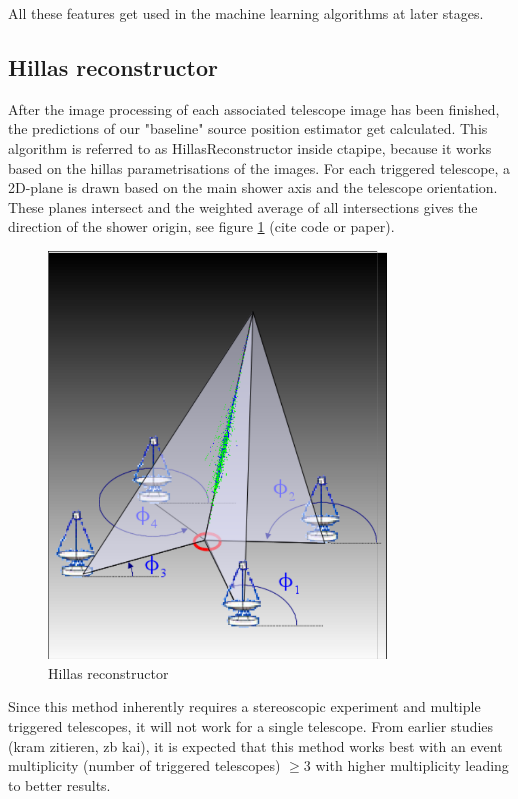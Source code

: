 All these features get used in the machine learning algorithms at later stages.

\subsection{Hillas reconstructor}  %
After the image processing of each associated telescope image has been finished,
the predictions of our "baseline" source position estimator get calculated.
This algorithm is referred to as HillasReconstructor inside ctapipe, because 
it works based on the hillas parametrisations of the images.
For each triggered telescope, a 2D-plane is drawn based on the main shower 
axis and the telescope orientation. These planes intersect and 
the weighted average of all intersections gives the 
direction of the shower origin,
see figure \ref{fig:hillas_reconstructor} (cite code or paper).

\begin{figure}
	\centering
	\includegraphics[width=0.8\textwidth]{images/hillas_reco.png}
	\caption{Hillas reconstructor}
	\label{fig:hillas_reconstructor}
\end{figure}

Since this method inherently requires a stereoscopic experiment
and multiple triggered telescopes, it will not work for a single telescope.
From earlier studies (kram zitieren, zb kai), it is expected
that this method works best with an event multiplicity 
(number of triggered telescopes) $\geq 3$ with higher multiplicity
leading to better results.

